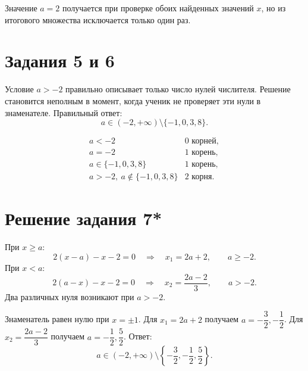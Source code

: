 \begin{criterionbox}
  Значение \(a=2\) получается при проверке обоих найденных значений \(x\),
  но из итогового множества исключается только один раз.
\end{criterionbox}

\section*{Задания 5 и 6}

\begin{teacheranswer}[Задание 5]
  Условие \(a>-2\) правильно описывает только число нулей числителя. Решение
  становится неполным в момент, когда ученик не проверяет эти нули в
  знаменателе. Правильный ответ:
  \[
    \boxed{a\in(-2,+\infty)\setminus\{-1,0,3,8\}}.
  \]
\end{teacheranswer}

\begin{teacheranswer}[Задание 6]
  \[
    \begin{array}{c|c}
      a<-2 & 0\text{ корней},\\
      a=-2 & 1\text{ корень},\\
      a\in\{-1,0,3,8\} & 1\text{ корень},\\
      a>-2,\ a\notin\{-1,0,3,8\} & 2\text{ корня}.
    \end{array}
  \]
\end{teacheranswer}

\section*{Решение задания 7*}

\begin{teacheranswer}
  При \(x\ge a\):
  \[
    2(x-a)-x-2=0
    \quad\Longrightarrow\quad
    x_1=2a+2,
    \qquad a\ge-2.
  \]
  При \(x<a\):
  \[
    2(a-x)-x-2=0
    \quad\Longrightarrow\quad
    x_2=\frac{2a-2}{3},
    \qquad a>-2.
  \]
  Два различных нуля возникают при \(a>-2\).
\end{teacheranswer}

\begin{teacheranswer}
  Знаменатель равен нулю при \(x=\pm1\).
  Для \(x_1=2a+2\) получаем \(a=-\dfrac32,-\dfrac12\).
  Для \(x_2=\dfrac{2a-2}{3}\) получаем \(a=-\dfrac12,\dfrac52\).
  Ответ:
  \[
    \boxed{
      a\in(-2,+\infty)\setminus
      \left\{-\frac32,-\frac12,\frac52\right\}
    }.
  \]
\end{teacheranswer}

